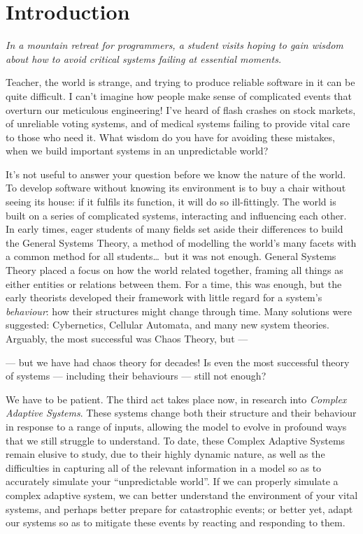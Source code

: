 \section{Introduction}


\footnotesize{\emph{In a mountain retreat for programmers, a student visits
    hoping to gain wisdom about how to avoid critical systems failing at
    essential moments.}}

\student Teacher, the world is strange, and trying to produce reliable software
in it can be quite difficult. I can't imagine how people make sense of
complicated events that overturn our meticulous engineering! I've heard of flash
crashes on stock markets, of unreliable voting systems, and of medical systems
failing to provide vital care to those who need it. What wisdom do you have for
avoiding these mistakes, when we build important systems in an unpredictable world?

\teacher It's not useful to answer your question before we know the nature of
the world. To develop software without knowing its environment is to buy a chair
without seeing its house: if it fulfils its function, it will do so
ill-fittingly.
\noindent The world is built on a series of complicated systems, interacting and
influencing each other. In early times, eager students of many fields set aside
their differences to build the General Systems Theory, a method of modelling the
world's many facets with a common method for all students\ldots{}~but it was not
enough.
\noindent General Systems Theory placed a focus on how the world related
together, framing all things as either entities or relations between them. For a
time, this was enough, but the early theorists developed their framework with
little regard for a system's \emph{behaviour}: how their structures might change
through time. Many solutions were suggested: Cybernetics, Cellular Automata, and
many new system theories. Arguably, the most successful was Chaos Theory, but
---

\student --- but we have had chaos theory for decades! Is even the most
successful theory of systems --- including their behaviours --- still not
enough?

\teacher We have to be patient. The third act takes place now, in research into
\emph{Complex Adaptive Systems}. These systems change both their structure and
their behaviour in response to a range of inputs, allowing the model to evolve
in profound ways that we still struggle to understand. To date, these Complex
Adaptive Systems remain elusive to study, due to their highly dynamic nature, as
well as the difficulties in capturing all of the relevant information in a model
so as to accurately simulate your ``unpredictable world''.
\noindent If we can properly simulate a complex adaptive system, we can better
understand the environment of your vital systems, and perhaps better prepare for
catastrophic events; or better yet, adapt our systems so as to mitigate these
events by reacting and responding to them.

